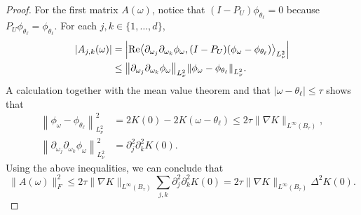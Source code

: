 \documentclass[11pt]{article}
\theoremstyle{definition}
\numberwithin{theorem}{section}
\numberwithin{lemma}{section}
\numberwithin{equation}{section}
\renewcommand{\Re}{{\rm Re}}
\newcommand{\norm}[1]{{\left\|#1\right\|}}
\newcommand{\inner}[1]{{\left\langle#1\right\rangle}}
\numberwithin{equation}{section}
\begin{document}
\begin{proof}
	For the first matrix $A(\omega)$, notice that $(I-P_U)\phi_{\theta_\ell}=0$ because $P_U\phi_{\theta_\ell} = \phi_{\theta_\ell}$. For each $j,k\in \{1,\dots,d\}$,  
	\begin{align*}
		|A_{j,k}(\omega)|
		&=\left| \Re\inner{\partial_{\omega_j} \partial_{\omega_k} \phi_\omega,  (I-P_U) (\phi_\omega-\phi_{\theta_\ell})}_{L^2_\nu} \right| \\
		&\leq \norm{\partial_{\omega_j} \partial_{\omega_k} \phi_\omega}_{L^2_\nu}  \norm{\phi_\omega-\phi_{\theta_\ell}}_{L^2_\nu}.
	\end{align*}
	A calculation together with the mean value theorem and that $|\omega-\theta_\ell|\leq \tau$ shows that
	\begin{align*} 
		\norm{\phi_{\omega}-\phi_{\theta_\ell}}_{L^2_\nu}^2 
		&= 2K(0)-2K(\omega-\theta_\ell)
		\leq 2 \tau \|\nabla K\|_{L^\infty(B_\tau)}, \\
		\norm{\partial_{\omega_j} \partial_{\omega_k} \phi_\omega}_{L^2_\nu}^2
		&=\partial_j^2 \partial_k^2 K(0).  
	\end{align*}
	Using the above inequalities, we can conclude that 
	\begin{equation}
		\|A(\omega)\|_F^2
		\leq 2 \tau \|\nabla K\|_{L^\infty(B_\tau)} \sum_{j,k}  \partial_j^2 \partial_k^2 K(0)
		= 2 \tau \|\nabla K\|_{L^\infty(B_\tau)} \Delta^2 K(0).
		\label{eq:hessianq2}
	\end{equation}
	

\end{proof}
\end{document}
